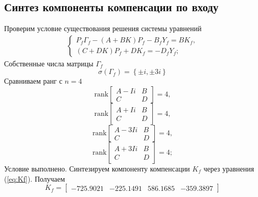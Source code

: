 \documentclass[a4paper, 12pt]{article}
\begin{document}
    \subsection{Синтез компоненты компенсации по входу}
    Проверим условие существования решения системы уравнений
    \begin{align}
        \begin{cases}
            P_f\Gamma_f-\left( A+BK \right)P_f-B_fY_f=BK_f,\\
            \left( C+DK \right)P_f+DK_f=-D_fY_f;
        \end{cases}\label{eq:Kf}
    \end{align}
    Собственные числа матрицы $\Gamma_f$
    $$
    \sigma\left( \Gamma_f \right)=\left\{ \pm i,\pm3i \right\}
    $$
    Сравниваем ранг с $n=4$
    $$
    \text{rank}\begin{bmatrix}
        A-Ii &B\\
        C &D
    \end{bmatrix}=4,
    $$
    $$
    \text{rank}\begin{bmatrix}
        A+Ii &B\\
        C &D
    \end{bmatrix}=4,
    $$
    $$
    \text{rank}\begin{bmatrix}
        A-3Ii &B\\
        C &D
    \end{bmatrix}=4,
    $$
    $$
    \text{rank}\begin{bmatrix}
        A+3Ii &B\\
        C &D
    \end{bmatrix}=4;
    $$
    Условие выполнено. Синтезируем компоненту компенсации $K_f$ через уравнения (\ref{eq:Kf}).
    Получаем
    $$
    K_f=\begin{bmatrix}
        -725.9021 &-225.1491  &586.1685 &-359.3897
    \end{bmatrix}
    $$
\end{document}
